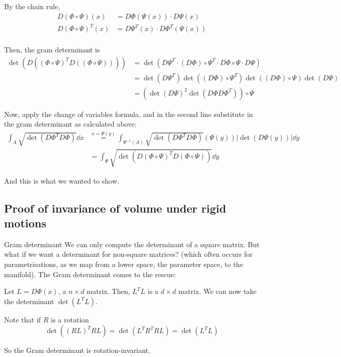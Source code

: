 \documentclass[12pt]{article}
\begin{document}
\begin{proofbox}
    By the chain rule,
    $$
        \begin{aligned}
            D (\Phi \circ \Psi)(x) &= D \Phi(\Psi(x)) \cdot D\Psi(x) \\
            D (\Phi \circ \Psi)^T(x) &= D \Psi^T(x) \cdot D \Phi^T(\Psi(x)) \\
        \end{aligned}
    $$

    Then, the gram determinant is
    $$
        \begin{aligned}
            \det\left( D \left( (\Phi \circ \Psi)^T D \left( (\Phi \circ \Psi) \right) \right) \right) &= \det\left( D \Psi^T \cdot (D \Phi) \circ \Psi^T \cdot D\Phi \circ \Psi \cdot D \Psi  \right) \\
            &= \det\left( D \Psi^T \right) \det\left( (D \Phi) \circ \Psi^T \right) \det\left( (D\Phi) \circ \Psi \right) \det\left( D \Psi \right) \\
            &= \left( \det\left( D \Psi \right)^2 \det\left( D \Phi D \Phi^T \right) \right) \circ \Psi
        \end{aligned}
    $$

    Now, apply the change of variables formula, and in the second line substitute in the gram determinant as calculated above:
    $$
    \begin{aligned}
        \int_A \sqrt{\det \left( D\Phi^T D \Phi \right)} \dd x &\overset{x = \Psi(y)} = \int_{\Psi^{-1}(A)} \sqrt{\det\left( D\Phi^T D \Phi \right)} (\Psi(y)) \left| \det \left( D \Psi(y)\right) \right| \dd y \\
        &= \int_{\Psi} \sqrt{\det\left( D\left( \Phi \circ \Psi \right)^T D\left( \Phi \circ \Psi \right) \right)} \dd y
    \end{aligned}
    $$

    And this is what we wanted to show.
\end{proofbox}

\subsection{Proof of invariance of volume under rigid motions}
\begin{notebox}{Gram determinant}{}
    We can only compute the determinant of a square matrix. But what if we want a determinant for non-square matrices? (which often occurs for parametrisations, as we map from a lower space, the parameter space, to the manifold). The Gram determinant comes to the rescue:

    Let $L = D \Phi(x)$, a $n \times d$ matrix. Then, $L^T L$ is a $d \times d$ matrix. We can now take the determinant $\det(L^T L)$.

    Note that if $R$ is a rotation
    $$
        \det((R L)^T RL) = \det(L^T R^T R L) = \det(L^T L)
    $$

    So the Gram determinant is rotation-invariant.
\end{notebox}
\end{document}
